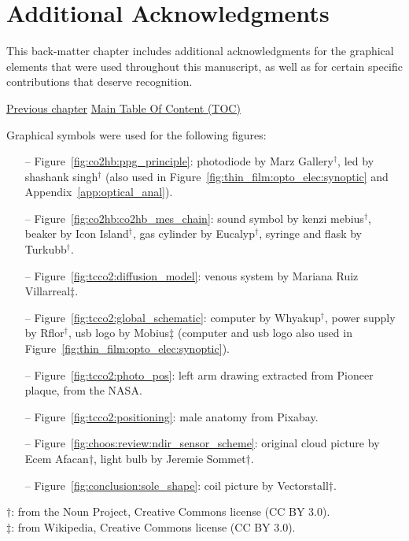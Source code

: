 \chapter{Additional Acknowledgments}\label{chap:add_ack}

\begin{tldrbox}
	This back-matter chapter includes additional acknowledgments for the graphical elements that were used throughout this manuscript, as well as for certain specific contributions that deserve recognition.
	
	\tcblower
	
	\hyperref[chap:biblio]{Previous chapter} \hfill \hyperref[chapter:toc]{Main Table Of Content (TOC)} \hfill \hphantom{Next chapter}
	
\end{tldrbox}

Graphical symbols were used for the following figures:

\begin{itemize}
	\item[--] Figure~\ref{fig:co2hb:ppg_principle}: photodiode by Marz Gallery$^\dagger$, \gls{led} by shashank singh$^\dagger$ (also used in Figure~\ref{fig:thin_film:opto_elec:synoptic} and Appendix~\ref{app:optical_anal}).
	\item[--] Figure~\ref{fig:co2hb:co2hb_mes_chain}: sound symbol by kenzi mebius$^\dagger$, beaker by Icon Island$^\dagger$, gas cylinder by Eucalyp$^\dagger$, syringe and flask by Turkubb$^\dagger$.
	\item[--] Figure~\ref{fig:tcco2:diffusion_model}: venous system by Mariana Ruiz Villarreal$\ddagger$.
	\item[--] Figure~\ref{fig:tcco2:global_schematic}: computer by Whyakup$^\dagger$, power supply by Rflor$^\dagger$, \gls{usb} logo by Mobius$\ddagger$ (computer and \gls{usb} logo also used in Figure~\ref{fig:thin_film:opto_elec:synoptic}).
	\item[--] Figure~\ref{fig:tcco2:photo_pos}: left arm drawing extracted from Pioneer plaque, from the NASA.
	\item[--] Figure~\ref{fig:tcco2:positioning}: male anatomy from Pixabay.
	\item[--] Figure~\ref{fig:choos:review:ndir_sensor_scheme}: original cloud picture by Ecem Afacan$\dagger$, light bulb by Jeremie Sommet$\dagger$.
	\item[--] Figure~\ref{fig:conclusion:sole_shape}: coil picture by Vectorstall$\dagger$.
\end{itemize}
$\dagger$: from the Noun Project, Creative Commons license (CC BY 3.0).\\$\ddagger$: from Wikipedia, Creative Commons license (CC BY 3.0).

